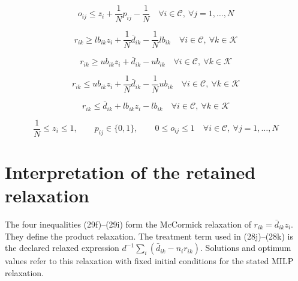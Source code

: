 \documentclass{article}
\begin{document}
\begin{equation}
o_{ij} \le z_i + \frac{1}{N}p_{ij} - \frac{1}{N}
\quad \forall i \in \mathcal C,\ \forall j=1,\dots,N
\tag{29e}
\end{equation}

\begin{equation}
r_{ik} \ge lb_{ik} z_i + \frac{1}{N}\bar d_{ik} - \frac{1}{N}lb_{ik}
\quad \forall i \in \mathcal C,\ \forall k \in \mathcal K
\tag{29f}
\end{equation}

\begin{equation}
r_{ik} \ge ub_{ik} z_i + \bar d_{ik} - ub_{ik}
\quad \forall i \in \mathcal C,\ \forall k \in \mathcal K
\tag{29g}
\end{equation}

\begin{equation}
r_{ik} \le ub_{ik} z_i + \frac{1}{N}\bar d_{ik} - \frac{1}{N}ub_{ik}
\quad \forall i \in \mathcal C,\ \forall k \in \mathcal K
\tag{29h}
\end{equation}

\begin{equation}
r_{ik} \le \bar d_{ik} + lb_{ik} z_i - lb_{ik}
\quad \forall i \in \mathcal C,\ \forall k \in \mathcal K
\tag{29i}
\end{equation}

\begin{equation}
\frac{1}{N} \le z_i \le 1,\qquad
p_{ij}\in\{0,1\},\qquad
0 \le o_{ij} \le 1
\quad \forall i \in \mathcal C,\ \forall j=1,\dots,N
\tag{29j}
\end{equation}

\section*{Interpretation of the retained relaxation}
The four inequalities (29f)--(29i) form the McCormick relaxation of
$r_{ik}=\bar d_{ik}z_i$. They define the product relaxation.
The treatment term used in (28j)--(28k) is the declared relaxed expression
$d^{-1}\sum_i(\bar d_{ik}-n_i r_{ik})$.
Solutions and optimum values refer to this relaxation with fixed initial
conditions for the stated MILP relaxation.
\end{document}
